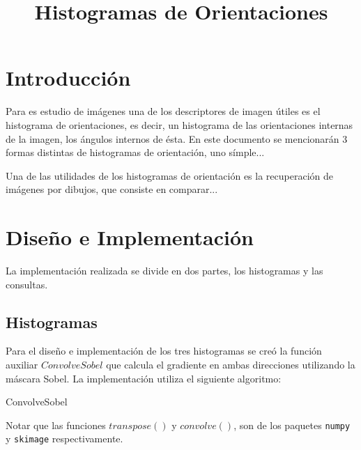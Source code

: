 \documentclass[conference]{IEEEtran}
\begin{document}
\title{Histogramas de Orientaciones}
\author{
}


\maketitle

\begin{abstract}
    
\end{abstract}
 

\section*{Introducción} %
    Para es estudio de imágenes una de los descriptores de imagen útiles es el histograma de orientaciones, es decir, un histograma de las orientaciones internas de la imagen, los ángulos internos de ésta. En este documento se mencionarán 3 formas distintas de histogramas de orientación, uno símple...
    
    Una de las utilidades de los histogramas de orientación es la recuperación de imágenes por dibujos, que consiste en comparar...
    
\section*{Diseño e Implementación}
	La implementación realizada se divide en dos partes, los histogramas y las consultas.
\subsection*{Histogramas}
	Para el diseño e implementación de los tres histogramas se creó la función auxiliar $ConvolveSobel$ que calcula el gradiente en ambas direcciones utilizando la máscara Sobel. La implementación utiliza el siguiente algoritmo: 

\begin{algorithm}
	\caption{ConvolveSobel}	
	\DontPrintSemicolon
	Notar que las funciones $transpose()$ y $convolve()$, son de los paquetes \texttt{numpy} y \texttt{skimage} respectivamente.
\end{algorithm}
	
\end{document}
